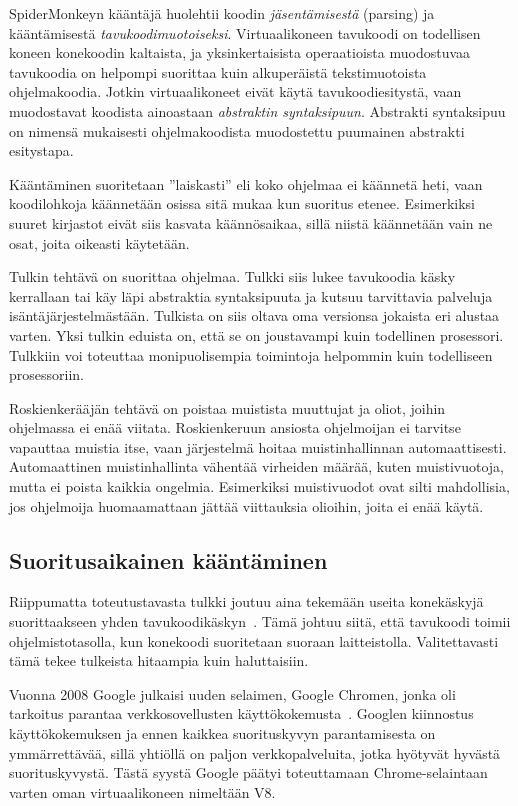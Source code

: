 SpiderMonkeyn kääntäjä huolehtii koodin \textit{jäsentämisestä} (parsing) ja kääntämisestä \textit{tavukoodimuotoiseksi}. Virtuaalikoneen tavukoodi on todellisen koneen konekoodin kaltaista, ja yksinkertaisista operaatioista muodostuvaa tavukoodia on helpompi suorittaa kuin alkuperäistä tekstimuotoista ohjelmakoodia. Jotkin virtuaalikoneet eivät käytä tavukoodiesitystä, vaan muodostavat koodista ainoastaan \textit{abstraktin syntaksipuun}. Abstrakti syntaksipuu on nimensä mukaisesti ohjelmakoodista muodostettu puumainen abstrakti esitystapa.

Kääntäminen suoritetaan ''laiskasti'' eli koko ohjelmaa ei käännetä heti, vaan koodilohkoja käännetään osissa sitä mukaa kun suoritus etenee. Esimerkiksi suuret kirjastot eivät siis kasvata käännösaikaa, sillä niistä käännetään vain ne osat, joita oikeasti käytetään.

Tulkin tehtävä on suorittaa ohjelmaa. Tulkki siis lukee tavukoodia käsky kerrallaan tai käy läpi abstraktia syntaksipuuta ja kutsuu tarvittavia palveluja isäntäjärjestelmästään. Tulkista on siis oltava oma versionsa jokaista eri alustaa varten. Yksi tulkin eduista on, että se on joustavampi kuin todellinen prosessori. Tulkkiin voi toteuttaa monipuolisempia toimintoja helpommin kuin todelliseen prosessoriin.

Roskienkerääjän tehtävä on poistaa muistista muuttujat ja oliot, joihin ohjelmassa ei enää viitata. Roskienkeruun ansiosta ohjelmoijan ei tarvitse vapauttaa muistia itse, vaan järjestelmä hoitaa muistinhallinnan automaattisesti. Automaattinen muistinhallinta vähentää virheiden määrää, kuten muistivuotoja, mutta ei poista kaikkia ongelmia. Esimerkiksi muistivuodot ovat silti mahdollisia, jos ohjelmoija huomaamattaan jättää viittauksia olioihin, joita ei enää käytä.

\subsection{Suoritusaikainen kääntäminen}

Riippumatta toteutustavasta tulkki joutuu aina tekemään useita konekäskyjä suorittaakseen yhden tavukoodikäskyn~\cite[s.~35]{vms}. Tämä johtuu siitä, että tavukoodi toimii ohjelmistotasolla, kun konekoodi suoritetaan suoraan laitteistolla. Valitettavasti tämä tekee tulkeista hitaampia kuin haluttaisiin.

Vuonna 2008 Google julkaisi uuden selaimen, Google Chromen, jonka oli tarkoitus parantaa verkkosovellusten käyttökokemusta~\cite{chromepress}. Googlen kiinnostus käyttökokemuksen ja ennen kaikkea suorituskyvyn parantamisesta on ymmärrettävää, sillä yhtiöllä on paljon verkkopalveluita, jotka hyötyvät hyvästä suorituskyvystä. Tästä syystä Google päätyi toteuttamaan Chrome-selaintaan varten oman virtuaalikoneen nimeltään V8.

